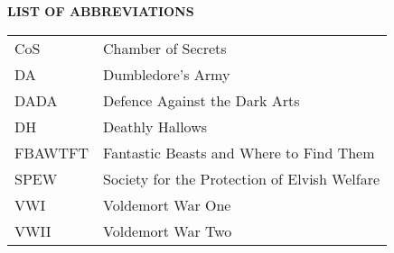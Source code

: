 {}

\begin{center}
\textbf{LIST OF ABBREVIATIONS}
\vspace{16pt}
\end{center}


\noindent
\begin{tabular}{p{0.8in} p{5in}}
CoS     & Chamber of Secrets\\
DA      & Dumbledore's Army\\
DADA    & Defence Against the Dark Arts\\
DH      & Deathly Hallows \\
FBAWTFT & Fantastic Beasts and Where to Find Them\\
SPEW    & Society for the Protection of Elvish Welfare\\
VWI     & Voldemort War One\\
VWII    & Voldemort War Two\\
\end{tabular}

\clearpage

